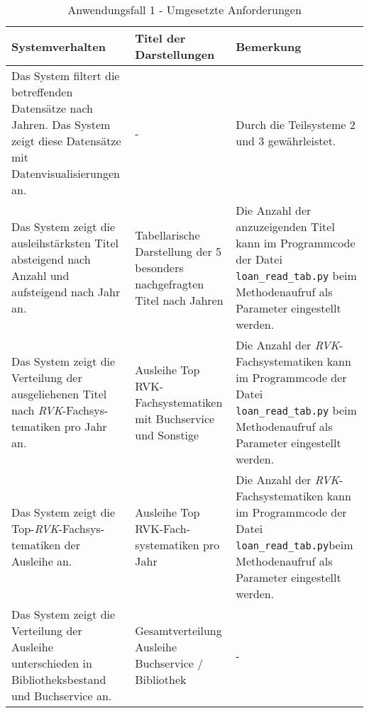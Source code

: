 \begingroup
    \setlength{\tabcolsep}{12pt} %
    \renewcommand{\arraystretch}{1.5} 
    \begin{table}[h]
        \Large
        \centering
        \begin{adjustbox}{max width=\textwidth}
        \begin{tabular}{p{}p{}p{}}
           \toprule
           Systemverhalten        &Titel der Darstellungen&Bemerkung\\
           \midrule
           Das System filtert die betreffenden Datensätze nach Jahren. Das System zeigt diese Datensätze mit Datenvisualisierungen an.&-&Durch die Teilsysteme 2  und 3 gewährleistet.\\
           Das System zeigt die ausleihstärksten Titel absteigend nach Anzahl und aufsteigend nach Jahr an.&Tabellarische Darstellung der 5 besonders nachgefragten Titel nach Jahren&Die Anzahl der anzuzeigenden Titel kann im Programmcode der Datei \texttt{loan\_read\_tab.py} beim Methodenaufruf als Parameter eingestellt werden.\\
           Das System zeigt die Verteilung der ausgeliehenen Titel nach \textit{\acrshort{RVK}}-Fachsys-tematiken pro Jahr an.&Ausleihe Top RVK-Fachsystematiken mit Buchservice und Sonstige&Die Anzahl der \textit{\acrshort{RVK}}-Fachsystematiken kann im Programmcode der Datei \texttt{loan\_read\_tab.py} beim Methodenaufruf als Parameter eingestellt werden.\\
           Das System zeigt die Top-\textit{\acrshort{RVK}}-Fachsys-tematiken der Ausleihe an.&Ausleihe Top RVK-Fach-systematiken pro Jahr\footnotemark&Die Anzahl der \textit{\acrshort{RVK}}-Fachsystematiken kann im Programmcode der Datei \texttt{loan\_read\_tab.py}beim Methodenaufruf als Parameter eingestellt werden.\\
           Das System zeigt die Verteilung der Ausleihe unterschieden in Bibliotheksbestand und Buchservice an.&Gesamtverteilung Ausleihe Buchservice / Bibliothek&-\\
        \bottomrule
        \end{tabular}
        \end{adjustbox}
        \caption{%
            Anwendungsfall 1 - Umgesetzte Anforderungen
        }
        \label{tab:Anwendungsfall 1 - Umgesetzte Anforderungen}
        \end{table}


